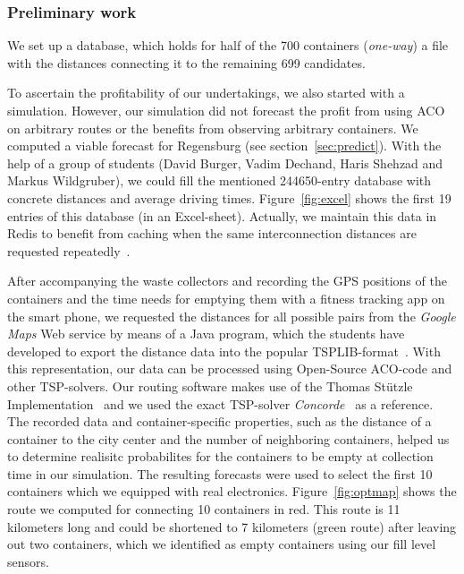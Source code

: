 \documentclass[10pt]{article}
\begin{document}
\subsubsection{Preliminary work}

We set up a database, which holds for half of the 700 containers ({\it one-way})
a file with the distances connecting it to the remaining 699 candidates.%

To ascertain the profitability of our undertakings, we also started with a simulation.
However, our simulation did not forecast the profit from using ACO on arbitrary 
routes or the benefits from observing arbitrary containers. We computed a viable 
forecast for 
Regensburg (see section~\ref{sec:predict}).
With the help of a group of students (David Burger, Vadim Dechand, 
Haris Shehzad and Markus Wildgruber), we could fill the mentioned 
244650-entry database with concrete distances and average driving times. 
Figure~\ref{fig:excel} shows the first 19 entries of this database (in an
Excel-sheet). Actually, we maintain this data in Redis to benefit from caching
when the same interconnection distances are requested repeatedly~\cite{Carlson13}. 

After accompanying
the waste collectors and recording the GPS positions of the containers and the time needs 
for emptying them with a fitness tracking app on the smart phone, we requested the
distances for all possible pairs from the {\it Google Maps} Web service by means of a 
Java program, which the students have developed to export the distance data into the
popular TSPLIB-format~\cite{tsplib90}. With this representation, our data can be 
processed using Open-Source ACO-code and other TSP-solvers. Our routing software makes
use of the Thomas St{\"u}tzle Implementation~\cite{Dorigo97} and we used the exact 
TSP-solver {\it Concorde}~\cite{applegate01} as a reference. 
The recorded data and container-specific properties, such as the distance of
a container to the city center and the number of neighboring containers, helped 
us to determine realisitc probabilites for the containers to be empty at collection
time in our simulation. The resulting forecasts were used to select the first 
10 containers which we equipped with real electronics.
Figure~\ref{fig:optmap}
shows the route we computed for connecting 10 containers in red. This route is 
11 kilometers long and could be shortened to 7 kilometers (green route) after
leaving out two containers, which we identified as empty containers using 
our fill level sensors.
\end{document}
